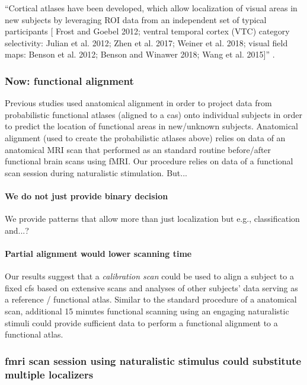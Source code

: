 ``Cortical atlases have been developed, which allow localization of visual areas
in new subjects by leveraging ROI data from an independent set of typical
participants [
    Frost and Goebel 2012;
    ventral temporal cortex (VTC) category selectivity:
    Julian et al. 2012;
    Zhen et al. 2017;
    Weiner et al. 2018;
    visual field maps:
    Benson et al. 2012;
    Benson and Winawer 2018;
    Wang et al. 2015]'' \citep{rosenke2021probabilistic}.



\subsubsection{Now: functional alignment}
%
Previous studies used anatomical alignment in order to project data from
probabilistic functional atlases (aligned to a \ac{cas}) onto individual
subjects in order to predict the location of functional areas in new/unknown
subjects.
%
Anatomical alignment (used to create the probabilistic atlases above) relies on
data of an anatomical MRI scan that performed as an standard routine
before/after functional brain scans using fMRI.
%
Our procedure relies on data of a functional scan session during naturalistic
stimulation.
%
But...


\paragraph{We do not just provide binary decision}


%
We provide patterns that allow more than just localization but e.g.,
classification and...?


\paragraph{Partial alignment would lower scanning time}
%
Our results suggest that a \textit{calibration scan} could be used to align a
subject to a fixed \ac{cfs} based on extensive scans and analyses of other
subjects' data serving as a reference / functional atlas.
%
Similar to the standard procedure of a anatomical scan, additional 15 minutes
functional scanning using an engaging naturalistic stimuli could provide
sufficient data to perform a functional alignment to a functional atlas.

\subsubsection{\ac{fmri} scan session using naturalistic stimulus could
substitute multiple localizers}


